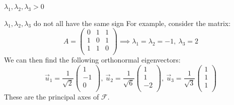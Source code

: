 \documentclass[../main.tex]{subfiles}
\begin{document}
\begin{example}
\begin{proofcases}
\begin{case}{$\lambda_1, \lambda_2, \lambda_3 > 0$}
\begin{center}
      \end{center}
    \end{case}
    \begin{case}{$\lambda_1, \lambda_2, \lambda_3$ do not all have the same sign}
      For example, consider the matrix:
      \[
        A = \begin{pmatrix}
        0 & 1 & 1 \\
        1 & 0 & 1 \\
        1 & 1 & 0 \\
        \end{pmatrix}
        \implies \lambda_1 = \lambda_2 = - 1,\ \lambda_3 = 2
      \]
      We can then find the following orthonormal eigenvectors:
      \[
        \vec{u}_1 = \frac{1}{\sqrt{2}}\begin{pmatrix}
        1 \\
        -1 \\
        0 \\
        \end{pmatrix},\
        \vec{u}_2 = \frac{1}{\sqrt{6}}\begin{pmatrix}
        1 \\
        1 \\
        -2 \\
        \end{pmatrix},\
        \vec{u}_3 = \frac{1}{\sqrt{3}}\begin{pmatrix}
        1 \\
        1 \\
        1 \\
        \end{pmatrix}
      \]
      These are the principal axes of $\mathcal{F}$.


\end{case}
\end{proofcases}
\end{example}
\end{document}
